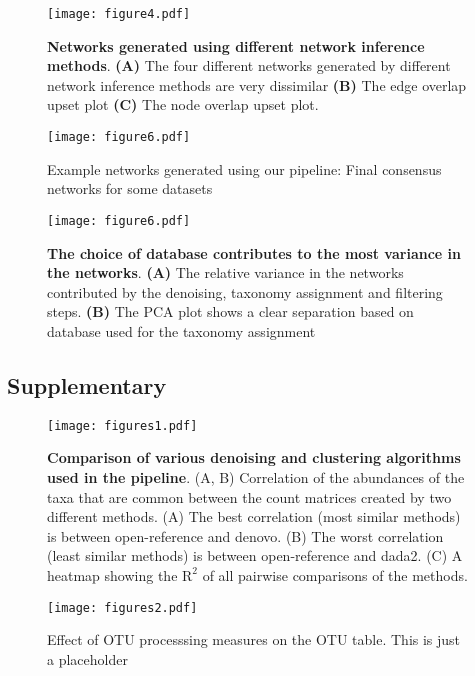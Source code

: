 \begin{figure}[h]
  \centering
  \texttt{[image: figure4.pdf]}
  \caption{
    \textbf{Networks generated using different network inference methods}.
    \textbf{(A)} The four different networks generated by different network inference methods are very dissimilar
    \textbf{(B)} The edge overlap upset plot
    \textbf{(C)} The node overlap upset plot.
  }
  \label{fig:figure4}
\end{figure}

\begin{figure}[h]
  \centering
  \texttt{[image: figure6.pdf]}
  \caption{Example networks generated using our pipeline: Final consensus networks for some datasets}
  \label{fig:figure6}
\end{figure}

\begin{figure}[h]
  \centering
  \texttt{[image: figure6.pdf]}
  \caption{
    \textbf{The choice of database contributes to the most variance in the networks}.
    \textbf{(A)} The relative variance in the networks contributed by the denoising, taxonomy assignment and filtering steps.
    \textbf{(B)} The PCA plot shows a clear separation based on database used for the taxonomy assignment
  }
  \label{fig:figure1}
\end{figure}


\FloatBarrier

\subsection*{Supplementary}%

\begin{figure}[h]
  \centering
  \texttt{[image: figures1.pdf]}
  \caption{
    \textbf{Comparison of various denoising and clustering algorithms used in the pipeline}.
    (A, B) Correlation of the abundances of the taxa that are common between the count matrices created by two different methods.
    (A) The best correlation (most similar methods) is between open-reference and denovo.
    (B) The worst correlation (least similar methods) is between open-reference and dada2.
    (C) A heatmap showing the $\mathrm{R}^2$ of all pairwise comparisons of the methods.
  }
  \label{fig:figures1}
\end{figure}

\begin{figure}[h]
  \centering
  \texttt{[image: figures2.pdf]}
  \caption{Effect of OTU processsing measures on the OTU table. This is just a placeholder}
  \label{fig:figures2}
\end{figure}

